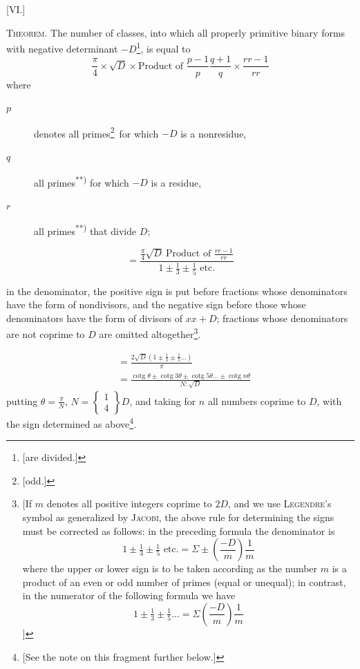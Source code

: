 \par\bigskip{}\centerline{[VI.]}\medskip
\textsc{Theorem.} The number of classes, into which all properly primitive binary forms with negative determinant $-D$\begingroup\renewcommand{\thefootnote}{*)}\footnote{[are divided.]}\endgroup, is equal to
\[
\frac\pi4\times\surd D\times\text{Product of }\frac{p-1}p\frac{q+1}q\times\frac{rr-1}{rr}
\]
where
\begin{description}
\item[$p$] denotes all primes\begingroup\renewcommand{\thefootnote}{**)}\footnote{[odd.]}\endgroup\ for which $-D$ is a nonresidue,
\item[$q$] all primes\textsuperscript{**)} for which $-D$ is a residue,
\item[$r$] all primes\textsuperscript{**)} that divide $D$;
\end{description}
\[
=\frac{\frac\pi4\surd D\ \text{Product of }\frac{rr-1}{rr}}{1\pm\tfrac13\pm\tfrac15\text{ etc.}}
\]

in the denominator, the positive sign is put before fractions whose denominators have the form of nondivisors, and the negative sign before those whose denominators have the form of divisors of $xx+D$; fractions whose denominators are not coprime to $D$ are omitted altogether\begingroup\renewcommand{\thefootnote}{***)}\footnote{[If $m$ denotes all positive integers coprime to $2D$, and we use \textsc{Legendre}'s symbol as generalized by \textsc{Jacobi}, the above rule for determining the signs must be corrected as follows: in the preceding formula the denominator is
\[
1\pm\tfrac13\pm\tfrac15\text{ etc.}=\Sigma\pm\left(\frac{-D}m\right)\frac1m
\]
where the upper or lower sign is to be taken according as the number $m$ is a product of an even or odd number of primes (equal or unequal); in contrast, in the numerator of the following formula we have
\[
1\pm\tfrac13\pm\tfrac15\ldots=\Sigma\left(\frac{-D}m\right)\frac1m
\]
]}\endgroup.

\[
\begin{aligned}
&=\frac{2\surd D(1\pm\tfrac13\pm\tfrac15\ldots)}\pi\\
&=\frac{\operatorname{cotg}\theta\pm\operatorname{cotg}3\theta\pm\operatorname{cotg}5\theta\ldots\pm\operatorname{cotg}n\theta}{N:\surd D}
\end{aligned}
\]
putting $\theta=\frac\pi N$, $N=\left\{\begin{smallmatrix}1\\4\end{smallmatrix}\right\}D$, and taking for $n$ all numbers coprime to $D$, with the sign determined as above\begingroup\renewcommand{\thefootnote}{*)}\footnote{[See the note on this fragment further below.]}\endgroup.

